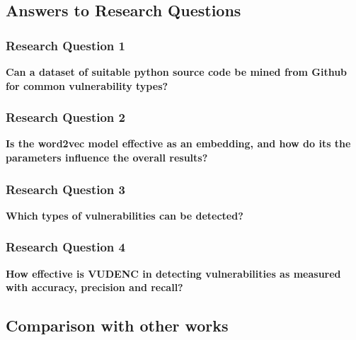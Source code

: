 \documentclass[
	a4paper,
	pagesize,
	pdftex,
	12pt,
	twoside, %
	BCOR=5mm, %
	ngerman,
	fleqn,
	final,
	]{scrartcl}
\begin{document}
\subsection{Answers to Research Questions}

\subsubsection{Research Question 1}
\textbf{Can a dataset of suitable python source code be mined from Github for common vulnerability types?}


\subsubsection{Research Question 2}
\textbf{Is the word2vec model effective as an embedding, and how do its the parameters influence the overall results?}

\subsubsection{Research Question 3}
\textbf{Which types of vulnerabilities can be detected?}

\subsubsection{Research Question 4}
\textbf{How effective is VUDENC in detecting vulnerabilities as measured with accuracy, precision and recall? }


\subsection{Comparison with other works}
\end{document}

